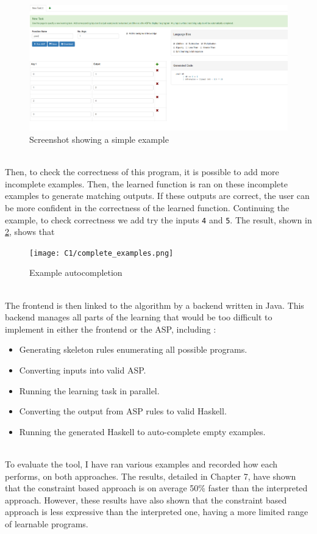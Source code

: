 \begin{figure}[h!]
\centering
\includegraphics[width=\textwidth]{C1/screenshot_pow2.png}
\caption{Screenshot showing a simple example}
\label{fig:screenshot}
\end{figure}
\mbox{}\\
Then, to check the correctness of this program, it is possible to add more incomplete examples. Then, the learned function is ran on these incomplete examples to generate matching outputs. If these outputs are correct, the user can be more confident in the correctness of the learned function. Continuing the example, to check correctness we add try the inputs \lstinline!4! and \lstinline!5!. The result, shown in \ref{fig:function_correctness}, shows that 

\begin{figure}[h!]
\centering
\texttt{[image: C1/complete\_examples.png]}
\caption{Example autocompletion}
\label{fig:function_correctness}
\end{figure}
\mbox{}\\
The frontend is then linked to the algorithm by a backend written in Java. This backend manages all parts of the learning that would be too difficult to implement in either the frontend or the ASP, including :
\begin{itemize}
\item Generating skeleton rules enumerating all possible programs.
\item Converting inputs into valid ASP.
\item Running the learning task in parallel.
\item Converting the output from ASP rules to valid Haskell.
\item Running the generated Haskell to auto-complete empty examples.
\end{itemize}
\mbox{}\\
To evaluate the tool, I have ran various examples and recorded how each performs, on both approaches. The results, detailed in Chapter 7, have shown that the constraint based approach is on average 50\% faster than the interpreted approach. However, these results have also shown that the constraint based approach is less expressive than the interpreted one, having a more limited range of learnable programs.

